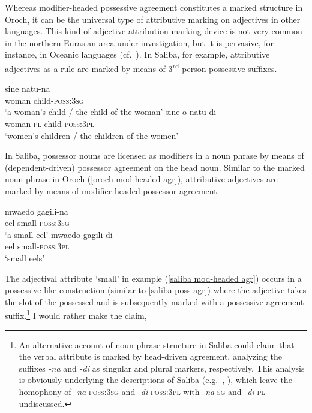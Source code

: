 Whereas modifier\hyp{}headed possessive agreement constitutes a marked structure in Oroch, it can be the universal type of attributive marking on adjectives in other languages. This kind of adjective attribution marking device is not very common in the northern Eurasian area under investigation, but it is pervasive, for instance, in Oceanic languages (cf.~\citealt{ross1998}). In Saliba, for example, attributive adjectives as a rule are marked by means of 3\textsuperscript{rd} person possessive suffixes.
\begin{exe}
\ex
{} \label{saliba poss-agr}
\begin{xlist}
\ex
\gll 	sine natu-na\\
 	woman child-\textsc{poss:3sg}\\
\glt ‘a woman's child / the child of the woman’
\ex
\gll 	sine-o natu-di\\
	woman-\textsc{pl} child-\textsc{poss:3pl}\\
\glt	‘women's children / the children of the women’%
\end{xlist}
\end{exe}
In Saliba, possessor nouns are licensed as modifiers in a noun phrase by means of (dependent-driven) possessor agreement on the head noun. Similar to the marked noun phrase in Oroch (\ref{oroch mod-headed agr}), attributive adjectives are marked by means of modifier\hyp{}headed possessor agreement.
\begin{exe}
\ex
{} \label{saliba mod-headed agr}
\begin{xlist}
\ex
\gll 	mwaedo gagili-na\\
 eel small-\textsc{poss:3sg}\\
\glt ‘a small eel’
\ex
\gll 	mwaedo gagili-di\\
	eel small-\textsc{poss:3pl}\\
\glt ‘small eels’
\end{xlist}
\end{exe}
The adjectival attribute ‘small’ in example (\ref{saliba mod-headed agr}) occurs in a possessive-like construction (similar to \ref{saliba poss-agr}) where the adjective takes the slot of the possessed and is subsequently marked with a possessive agreement suffix.\footnote{An alternative account of noun phrase structure in Saliba could claim that the verbal attribute is marked by head\hyp{}driven agreement, analyzing the suffixes \textit{-na} and \textit{-di} as singular and plural markers, respectively. This analysis is obviously underlying the descriptions of Saliba (e.g.~\citealt{mosel1994}, \citealt{margetts1999}), which leave the homophony of \textit{-na} \textsc{poss:3sg} and \textit{-di} \textsc{poss:3pl} with \textit{-na} \textsc{sg} and \textit{-di} \textsc{pl} undiscussed.}  I would rather make the claim, %

